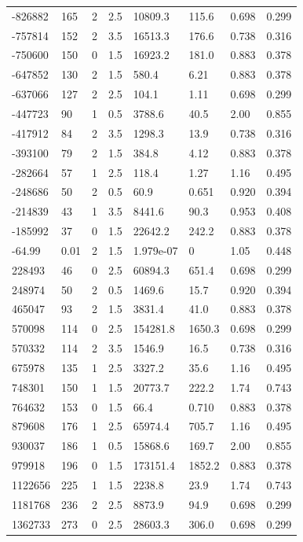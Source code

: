 \documentclass[preview]{standalone}
\begin{document}
{{\begin{tabular}{L{1.2cm}C{1.2cm} C{0.3cm}C{0.5cm} C{1.4cm}C{1.4cm} C{1.4cm}C{1.4cm}}
  -826882  &   165  & 2     & 2.5 &  10809.3  & 115.6  & 0.698 &  0.299   \\ 
  -757814  &   152  & 2     & 3.5 &  16513.3  & 176.6  & 0.738 &  0.316   \\ 
  -750600  &   150  & 0     & 1.5 &  16923.2  & 181.0  & 0.883 &  0.378   \\ 
  -647852  &   130  & 2     & 1.5 &  580.4  & 6.21  & 0.883 &  0.378   \\ 
  -637066  &   127  & 2     & 2.5 &  104.1  & 1.11  & 0.698 &  0.299   \\ 
  -447723  &    90  & 1     & 0.5 &  3788.6  & 40.5  & 2.00 &  0.855   \\ 
  -417912  &    84  & 2     & 3.5 &  1298.3  & 13.9  & 0.738 &  0.316   \\ 
  -393100  &    79  & 2     & 1.5 &  384.8  & 4.12  & 0.883 &  0.378   \\ 
  -282664  &    57  & 1     & 2.5 &  118.4  & 1.27  & 1.16 &  0.495   \\ 
  -248686  &    50  & 2     & 0.5 &  60.9  & 0.651  & 0.920 &  0.394   \\ 
  -214839  &    43  & 1     & 3.5 &  8441.6  & 90.3  & 0.953 &  0.408   \\ 
  -185992  &    37  & 0     & 1.5 &  22642.2  & 242.2  & 0.883 &  0.378   \\ 
  -64.99  &  0.01  & 2     & 1.5 &  1.979e-07  & 0  & 1.05 &  0.448   \\ 
  228493  &    46  & 0     & 2.5 &  60894.3  & 651.4  & 0.698 &  0.299   \\ 
  248974  &    50  & 2     & 0.5 &  1469.6  & 15.7  & 0.920 &  0.394   \\ 
  465047  &    93  & 2     & 1.5 &  3831.4  & 41.0  & 0.883 &  0.378   \\ 
  570098  &   114  & 0     & 2.5 &  154281.8  & 1650.3  & 0.698 &  0.299   \\ 
  570332  &   114  & 2     & 3.5 &  1546.9  & 16.5  & 0.738 &  0.316   \\ 
  675978  &   135  & 1     & 2.5 &  3327.2  & 35.6  & 1.16 &  0.495   \\ 
  748301  &   150  & 1     & 1.5 &  20773.7  & 222.2  & 1.74 &  0.743   \\ 
  764632  &   153  & 0     & 1.5 &  66.4  & 0.710  & 0.883 &  0.378   \\ 
  879608  &   176  & 1     & 2.5 &  65974.4  & 705.7  & 1.16 &  0.495   \\ 
  930037  &   186  & 1     & 0.5 &  15868.6  & 169.7  & 2.00 &  0.855   \\ 
  979918  &   196  & 0     & 1.5 &  173151.4  & 1852.2  & 0.883 &  0.378   \\ 
  1122656  &   225  & 1     & 1.5 &  2238.8  & 23.9  & 1.74 &  0.743   \\ 
  1181768  &   236  & 2     & 2.5 &  8873.9  & 94.9  & 0.698 &  0.299   \\ 
  1362733  &   273  & 0     & 2.5 &  28603.3  & 306.0  & 0.698 &  0.299   \\ 
\hline 
\end{tabular} 

}}
\end{document}
